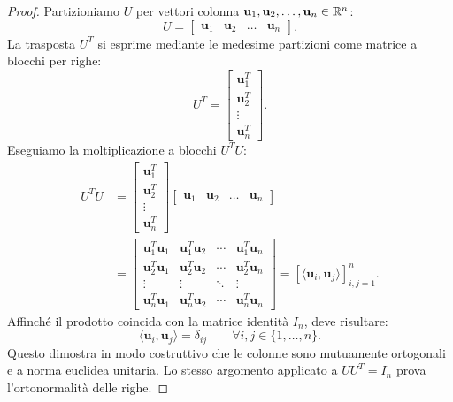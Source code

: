 \begin{proof}
Partizioniamo $U$ per vettori colonna $\mathbf{u}_1, \mathbf{u}_2, \dots, \mathbf{u}_n \in \mathbb{R}^n$:
\begin{equation}
    U = \begin{bmatrix} \mathbf{u}_1 & \mathbf{u}_2 & \dots & \mathbf{u}_n \end{bmatrix}.
\end{equation}
La trasposta $U^T$ si esprime mediante le medesime partizioni come matrice a blocchi per righe:
\begin{equation}
    U^T = \begin{bmatrix} \mathbf{u}_1^T \\ \mathbf{u}_2^T \\ \vdots \\ \mathbf{u}_n^T \end{bmatrix}.
\end{equation}
Eseguiamo la moltiplicazione a blocchi $U^T U$:
\begin{align}
    U^T U &= \begin{bmatrix} \mathbf{u}_1^T \\ \mathbf{u}_2^T \\ \vdots \\ \mathbf{u}_n^T \end{bmatrix} \begin{bmatrix} \mathbf{u}_1 & \mathbf{u}_2 & \dots & \mathbf{u}_n \end{bmatrix} \nonumber \\
    &= \begin{bmatrix}
        \mathbf{u}_1^T \mathbf{u}_1 & \mathbf{u}_1^T \mathbf{u}_2 & \cdots & \mathbf{u}_1^T \mathbf{u}_n \\
        \mathbf{u}_2^T \mathbf{u}_1 & \mathbf{u}_2^T \mathbf{u}_2 & \cdots & \mathbf{u}_2^T \mathbf{u}_n \\
        \vdots & \vdots & \ddots & \vdots \\
        \mathbf{u}_n^T \mathbf{u}_1 & \mathbf{u}_n^T \mathbf{u}_2 & \cdots & \mathbf{u}_n^T \mathbf{u}_n
    \end{bmatrix} = \left[ \langle \mathbf{u}_i, \mathbf{u}_j \rangle \right]_{i,j=1}^n.
\end{align}
Affinch\'e il prodotto coincida con la matrice identit\`a $I_n$, deve risultare:
\begin{equation}
    \langle \mathbf{u}_i, \mathbf{u}_j \rangle = \delta_{ij} \qquad \forall i, j \in \{1, \dots, n\}.
\end{equation}
Questo dimostra in modo costruttivo che le colonne sono mutuamente ortogonali e a norma euclidea unitaria. Lo stesso argomento applicato a $U U^T = I_n$ prova l'ortonormalit\`a delle righe.
\end{proof}

